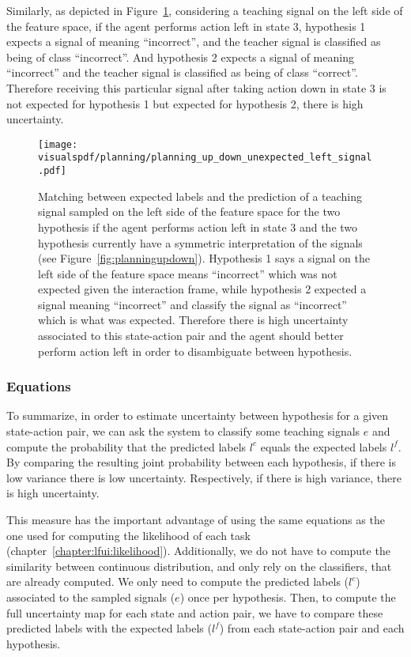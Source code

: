 Similarly, as depicted in Figure~\ref{fig:uncertaintymeaningupdownunexpectedleft}, considering a teaching signal on the left side of the feature space, if the agent performs action left in state 3, hypothesis 1 expects a signal of meaning ``incorrect'', and the teacher signal is classified as being of class ``incorrect''. And hypothesis 2 expects a signal of meaning ``incorrect'' and the teacher signal is classified as being of class ``correct''. Therefore receiving this particular signal after taking action down in state 3 is not expected for hypothesis 1 but expected for hypothesis 2, there is high uncertainty.

\begin{figure}[!htbp]
  \centering
  \texttt{[image: \\visualspdf/planning/planning\_up\_down\_unexpected\_left\_signal.pdf]}
  \caption{Matching between expected labels and the prediction of a teaching signal sampled on the left side of the feature space for the two hypothesis if the agent performs action left in state 3 and the two hypothesis currently have a symmetric interpretation of the signals (see Figure~\ref{fig:planningupdown}). Hypothesis 1 says a signal on the left side of the feature space means ``incorrect'' which was not expected given the interaction frame, while hypothesis 2 expected a signal meaning ``incorrect'' and classify the signal as ``incorrect'' which is what was expected. Therefore there is high uncertainty associated to this state-action pair and the agent should better perform action left in order to disambiguate between hypothesis.}
  \label{fig:uncertaintymeaningupdownunexpectedleft}
\end{figure}

\subsubsection*{Equations}

To summarize, in order to estimate uncertainty between hypothesis for a given state-action pair, we can ask the system to classify some teaching signals $e$ and compute the probability that the predicted labels $l^c$ equals the expected labels $l^f$. By comparing the resulting joint probability between each hypothesis, if there is low variance there is low uncertainty. Respectively, if there is high variance, there is high uncertainty. 

This measure has the important advantage of using the same equations as the one used for computing the likelihood of each task (chapter~\ref{chapter:lfui:likelihood}). Additionally, we do not have to compute the similarity between continuous distribution, and only rely on the classifiers, that are already computed. We only need to compute the predicted labels ($l^c$) associated to the sampled signals ($e$) once per hypothesis. Then, to compute the full uncertainty map for each state and action pair, we have to compare these predicted labels with the expected labels ($l^f$) from each state-action pair and each hypothesis.

